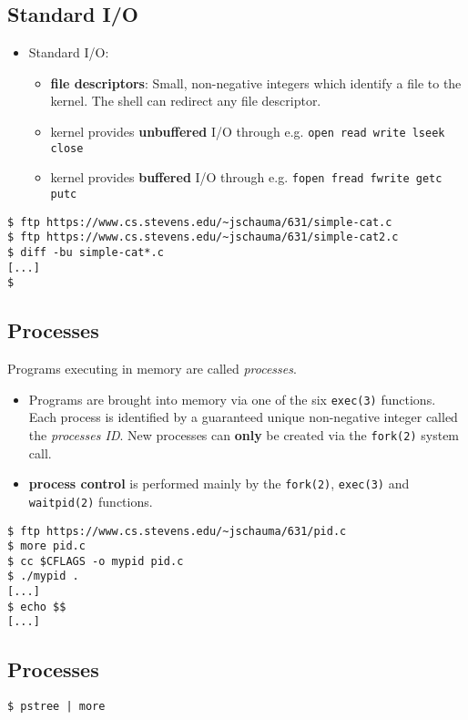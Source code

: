 \documentclass[sxga]{xdvislides}
\begin{document}
\subsection{Standard I/O}
\begin{itemize}
	\item	Standard I/O:
		\begin{itemize}
			\item {\bf file descriptors}: Small, non-negative
				integers which identify a file to the kernel.
				The shell can redirect any file descriptor.
			\item kernel provides {\bf unbuffered} I/O through e.g.
				{\tt open read write lseek close}
			\item kernel provides {\bf buffered} I/O through e.g.
				{\tt fopen fread fwrite getc putc}
		\end{itemize}
\end{itemize}
\vspace*{\fill}
\begin{verbatim}
$ ftp https://www.cs.stevens.edu/~jschauma/631/simple-cat.c
$ ftp https://www.cs.stevens.edu/~jschauma/631/simple-cat2.c
$ diff -bu simple-cat*.c
[...]
$
\end{verbatim}
\vspace*{\fill}


\subsection{Processes}
Programs executing in memory are called {\em processes}.
\begin{itemize}
	\item Programs are brought into memory via one of the
		six {\tt exec(3)} functions.  Each process is identified
		by a guaranteed unique non-negative integer called the
		{\em processes ID}. New processes can {\bf only} be
		created via the {\tt fork(2)} system call.
	\item {\bf process control} is performed mainly by the
		{\tt fork(2)}, {\tt exec(3)} and {\tt waitpid(2)} functions.
\end{itemize}
\vspace*{\fill}
\begin{verbatim}
$ ftp https://www.cs.stevens.edu/~jschauma/631/pid.c
$ more pid.c
$ cc $CFLAGS -o mypid pid.c
$ ./mypid .
[...]
$ echo $$
[...]
\end{verbatim}
\vspace*{\fill}

\subsection{Processes}
\vspace*{\fill}
\Huge
\begin{center}
	{\tt \$ pstree | more}
\end{center}
\Normalsize
\vspace*{\fill}
\end{document}

